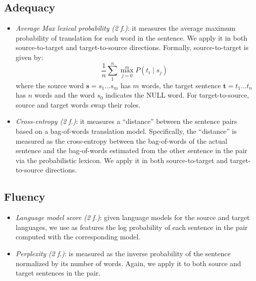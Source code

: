 \documentclass[a0]{sciposter}
\begin{document}
\begin{multicols*}{2}
\subsection*{Adequacy} 
\begin{itemize}
  \item \textit{Average Max lexical probability (2 f.)}: it measures the average maximum probability of translation for each word in the sentence. We apply it in both source-to-target and target-to-source directions. Formally, source-to-target is given by:
  $$ \frac{1}{n}\sum_1^n\max_{j=0}^m P(t_i\mid s_j) $$
  where the source word $\mathbf{s}=s_1\ldots s_m$ has $m$ words, the target sentence $\mathbf{t}=t_1\ldots t_n$ has $n$ words and the word $s_0$ indicates the NULL word. For target-to-source, source and target words swap their roles.
  \item \textit{Cross-entropy (2 f.)}: it measures a ``distance'' between the sentence pairs based on a bag-of-words translation model. Specifically, the ``distance'' is measured as the cross-entropy between the bag-of-words of the actual sentence and the bag-of-words estimated from the other sentence in the pair via the probabilistic lexicon. We apply it in both source-to-target and target-to-source directions.
\end{itemize}

\subsection*{Fluency} 
\begin{itemize}
  \item \textit{Language model score (2 f.)}: given language models for the source and target languages, we use as features the log probability of each sentence in the pair computed with the corresponding model.
  \item \textit{Perplexity (2 f.)}: is measured as the inverse probability of the sentence normalized by its number of words. Again, we apply it to both source and target sentences in the pair.
\end{itemize}


\end{multicols*}
\end{document}
